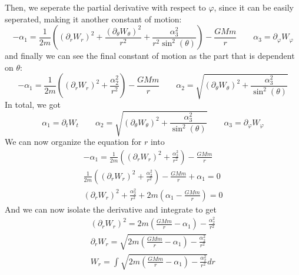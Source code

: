 \documentclass{article}
\begin{document}
Then, we seperate the partial derivative with respect to $\varphi$, since it can be easily seperated, making it another constant of motion:
\begin{equation}
    - \alpha_1 = \frac{1}{2m}\left(
        \left(\partial_r W_r\right)^2 + \frac{\left(\partial_\theta W_\theta\right)^2}{r^2} + \frac{\alpha_3^2}{r^2\sin^2(\theta)}
    \right) - \frac{GMm}{r}
    \qquad
    \alpha_3 = \partial_\varphi W_\varphi
\end{equation}
and finally we can see the final constant of motion as the part that is dependent on $\theta$:
\begin{equation}
    - \alpha_1 = \frac{1}{2m}\left(
        \left(\partial_r W_r\right)^2 + \frac{\alpha_2^2}{r^2}
    \right) - \frac{GMm}{r}
    \qquad
    \alpha_2 = \sqrt{\left(\partial_\theta W_\theta\right)^2 + \frac{\alpha_3^2}{\sin^2(\theta)}}
\end{equation}
In total, we got
\begin{equation}
\label{eq:constants}
    \alpha_1 = \partial_t W_t \qquad \alpha_2 = \sqrt{\left(\partial_\theta W_\theta\right)^2 + \frac{\alpha_3^2}{\sin^2(\theta)}} \qquad \alpha_3 = \partial_\varphi W_\varphi
\end{equation}
We can now organize the equation for $r$ into
\begin{equation}
\begin{gathered}
    - \alpha_1 = \frac{1}{2m}\left(
        \left(\partial_r W_r\right)^2 + \frac{\alpha_2^2}{r^2}
    \right) - \frac{GMm}{r}
    \\
    \frac{1}{2m}\left(
        \left(\partial_r W_r\right)^2 + \frac{\alpha_2^2}{r^2}
    \right) - \frac{GMm}{r} + \alpha_1 = 0
    \\
    \left(\partial_r W_r\right)^2 + \frac{\alpha_2^2}{r^2} + 2m\left(\alpha_1 - \frac{GMm}{r}\right) = 0
\end{gathered}
\end{equation}
And we can now isolate the derivative and integrate to get
\begin{equation}
\begin{gathered}
\label{eq:rs}
    \left(\partial_r W_r\right)^2 = 2m\left(\frac{GMm}{r} - \alpha_1\right)-\frac{\alpha_2^2}{r^2}
    \\
    \partial_r W_r = \sqrt{2m\left(\frac{GMm}{r} - \alpha_1\right)-\frac{\alpha_2^2}{r^2}}
    \\
    W_r = \int \sqrt{2m\left(\frac{GMm}{r} - \alpha_1\right)-\frac{\alpha_2^2}{r^2}} dr
\end{gathered}
\end{equation}
\end{document}
